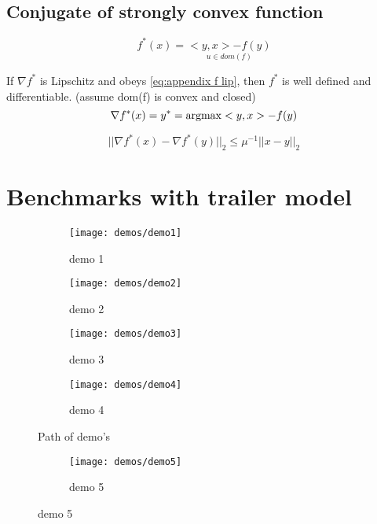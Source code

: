 	\section{Conjugate of strongly convex function}
	\label{appendix:conjugate of strongly convex function}
		\begin{equation}
			f^*(x)= \underset{u \in dom(f)}{<y,x>-f(y)}
		\end{equation}
		
		If $\nabla f^*$ is Lipschitz and obeys \eqref{eq:appendix f lip}, then $f^*$ is well defined and differentiable. (assume dom(f) is convex and closed)
		\begin{equation}
			\nabla f^*(x) = y^* = \operatorname{argmax} <y,x> - f(y)
		\end{equation}
		
		\begin{equation}
			|| \nabla f^*(x) - \nabla f^*(y) ||_2 \leq \mu^{-1} ||x-y||_2
			\label{eq:appendix f lip}
		\end{equation}
		
\chapter{Benchmarks with trailer model}
\label{appendix:paths trailer simulations}

\begin{figure}[H]
	\centering
	\begin{subfigure}[b]{0.40\textwidth}
		\centering
		\texttt{[image: demos/demo1]}
		\caption{demo 1}
		\label{fig:demo 1}
	\end{subfigure}
	\hfill
	\begin{subfigure}[b]{0.40\textwidth}
		\centering
		\texttt{[image: demos/demo2]}
		\caption{demo 2}
		\label{fig:demo 2}
	\end{subfigure}
	\begin{subfigure}[b]{0.40\textwidth}
		\centering
		\texttt{[image: demos/demo3]}
		\caption{demo 3}
		\label{fig:demo 3}
	\end{subfigure}
	\hfill
	\begin{subfigure}[b]{0.40\textwidth}
		\centering
		\texttt{[image: demos/demo4]}
		\caption{demo 4}
		\label{fig:demo 4}
	\end{subfigure}
	\caption{Path of demo's}
	\label{fig:demos}
\end{figure}
\begin{figure}[H]
	\centering
	\begin{subfigure}[b]{0.45\textwidth}
		\centering
		\texttt{[image: demos/demo5]}
		\caption{demo 5}
		\label{fig:demo 5}
	\end{subfigure}
\end{figure}

